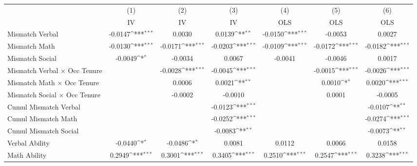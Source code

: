 {
\def\sym#1{\ifmmode^{#1}\else\(^{#1}\)\fi}
\begin{tabular}{l*{6}{c}}
\hline  
                    &\multicolumn{1}{c}{(1)}&\multicolumn{1}{c}{(2)}&\multicolumn{1}{c}{(3)}&\multicolumn{1}{c}{(4)}&\multicolumn{1}{c}{(5)}&\multicolumn{1}{c}{(6)}\\
                    &\multicolumn{1}{c}{IV}&\multicolumn{1}{c}{IV}&\multicolumn{1}{c}{IV}&\multicolumn{1}{c}{OLS}&\multicolumn{1}{c}{OLS}&\multicolumn{1}{c}{OLS}\\
\hline  
Mismatch Verbal     &     -0.0147\sym{***}&      0.0030         &      0.0139\sym{**} &     -0.0150\sym{***}&     -0.0053         &      0.0027         \\
[1em]
Mismatch Math       &     -0.0130\sym{***}&     -0.0171\sym{***}&     -0.0203\sym{***}&     -0.0109\sym{***}&     -0.0172\sym{***}&     -0.0182\sym{***}\\
[1em]
Mismatch Social     &     -0.0049\sym{*}  &     -0.0034         &      0.0067         &     -0.0041         &     -0.0046         &      0.0017         \\
[1em]
Mismatch Verbal $\times$ Occ Tenure&                     &     -0.0028\sym{***}&     -0.0045\sym{***}&                     &     -0.0015\sym{***}&     -0.0026\sym{***}\\
[1em]
Mismatch Math $\times$ Occ Tenure&                     &      0.0006         &      0.0021\sym{**} &                     &      0.0010\sym{*}  &      0.0020\sym{***}\\
[1em]
Mismatch Social $\times$ Occ Tenure&                     &     -0.0002         &     -0.0010         &                     &      0.0001         &     -0.0005         \\
[1em]
Cumul Mismatch Verbal&                     &                     &     -0.0123\sym{***}&                     &                     &     -0.0107\sym{**} \\
[1em]
Cumul Mismatch Math &                     &                     &     -0.0252\sym{***}&                     &                     &     -0.0274\sym{***}\\
[1em]
Cumul Mismatch Social&                     &                     &     -0.0083\sym{**} &                     &                     &     -0.0073\sym{**} \\
[1em]
Verbal Ability      &     -0.0440\sym{*}  &     -0.0486\sym{*}  &      0.0081         &      0.0112         &      0.0066         &      0.0158         \\
[1em]
Math Ability        &      0.2949\sym{***}&      0.3001\sym{***}&      0.3405\sym{***}&      0.2510\sym{***}&      0.2547\sym{***}&      0.3238\sym{***}\\

\end{tabular}}
